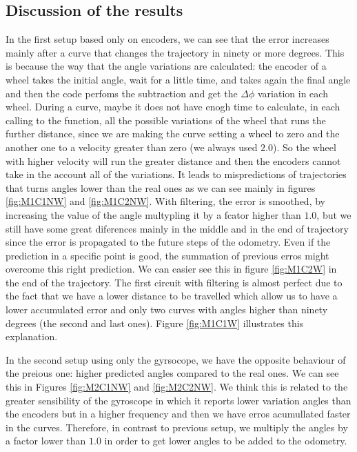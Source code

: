 \documentclass[twoside,conference,a4paper]{IEEEtran}
\begin{document}
\subsection{Discussion of the results}
In the first setup based only on encoders, we can see that the error increases mainly after a curve that changes the 
trajectory in ninety or more degrees. This is because the way that the angle variations are calculated: the encoder of
a wheel takes the initial angle, wait for a little time, and takes again the final angle and then the code perfoms
the subtraction and get the $ \Delta \phi $ variation in each wheel. During a curve, maybe it does not have enogh time
to calculate, in each calling to the function, all the possible variations of the wheel that runs the further distance,
since we are making the curve setting a wheel to zero and the another one to a velocity greater than zero (we always used $ 2.0 $). So the wheel with higher velocity will run the greater distance and then the encoders cannot
take in the account all of the variations. It leads to mispredictions of trajectories that turns angles lower than the real ones as we can see mainly in figures \ref{fig:M1C1NW} and \ref{fig:M1C2NW}. With filtering, the error is smoothed, by increasing the value of the angle multypling it by a fcator higher than $ 1.0 $, but
we still have some great diferences mainly in the middle and in the end of trajectory since the error is propagated
to the future steps of the odometry. Even if the prediction in a specific point is good, the summation of previous
erros might overcome this right prediction. We can easier see this in figure \ref{fig:M1C2W} in the end of the 
trajectory. The first circuit with filtering is almost perfect due to the fact that we have a lower distance 
to be travelled which allow us to have a lower accumulated error and only two curves with angles higher than ninety
degrees (the second and last ones). Figure \ref{fig:M1C1W} illustrates this explanation. \par
In the second setup using only the gyrsocope, we have the opposite behaviour of the preious one: higher predicted
angles compared to the real ones. We can see this in Figures \ref{fig:M2C1NW} and \ref{fig:M2C2NW}. We think this
is related to the greater sensibility of the gyroscope in which it reports lower variation angles than the encoders
but in a higher frequency and then we have erros acumullated faster in the curves. Therefore, in contrast to previous
setup, we multiply the angles by a factor lower than $ 1.0 $ in order to get lower angles to be added to the odometry. 
\end{document}

